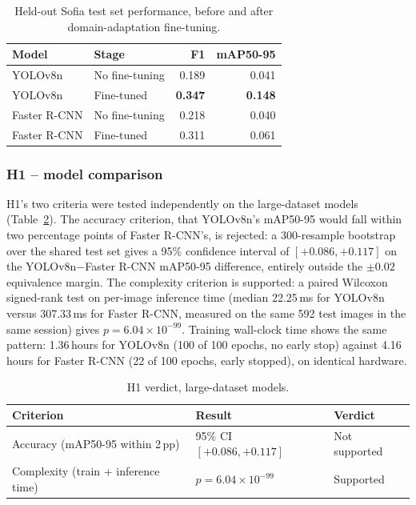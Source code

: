 \documentclass[10pt,a4paper,twocolumn]{article}
\begin{document}
\begin{table}[t]
  \centering
  \small
  \caption{Held-out Sofia test set performance, before and after
  domain-adaptation fine-tuning.}
  \label{tab:finetune-results}
  \begin{tabular}{@{}llrr@{}}
    \toprule
    Model & Stage & F1 & mAP50-95 \\
    \midrule
    YOLOv8n      & No fine-tuning & 0.189 & 0.041 \\
    YOLOv8n      & Fine-tuned     & \textbf{0.347} & \textbf{0.148} \\
    Faster R-CNN & No fine-tuning & 0.218 & 0.040 \\
    Faster R-CNN & Fine-tuned     & 0.311 & 0.061 \\
    \bottomrule
  \end{tabular}
\end{table}

\subsubsection{H1 -- model comparison}
\label{sec:res-h1}

H1's two criteria were tested independently on the large-dataset models
(Table~\ref{tab:h1-verdict}). The accuracy criterion, that YOLOv8n's mAP50-95
would fall within two percentage points of Faster R-CNN's, is rejected: a
300-resample bootstrap over the shared test set gives a 95\% confidence
interval of $[+0.086, +0.117]$ on the YOLOv8n$-$Faster R-CNN mAP50-95
difference, entirely outside the $\pm 0.02$ equivalence margin. The
complexity criterion is supported: a paired Wilcoxon signed-rank test on
per-image inference time (median 22.25\,ms for YOLOv8n versus 307.33\,ms
for Faster R-CNN, measured on the same 592 test images in the same
session) gives $p = 6.04 \times 10^{-99}$. Training wall-clock time shows
the same pattern: 1.36\,hours for YOLOv8n (100 of 100 epochs, no early
stop) against 4.16\,hours for Faster R-CNN (22 of 100 epochs, early
stopped), on identical hardware.

\begin{table}[t]
  \centering
  \small
  \caption{H1 verdict, large-dataset models.}
  \label{tab:h1-verdict}
  \begin{tabular}{@{}p{2.0cm}p{2.3cm}p{1.4cm}@{}}
    \toprule
    Criterion & Result & Verdict \\
    \midrule
    Accuracy (mAP50-95 within 2\,pp) & 95\% CI $[+0.086,+0.117]$ & Not supported \\
    Complexity (train + inference time) & $p{=}6.04{\times}10^{-99}$ & Supported \\
    \bottomrule
  \end{tabular}
\end{table}
\end{document}
